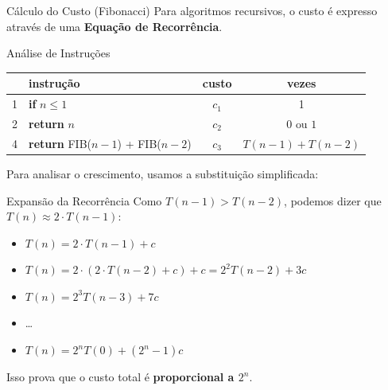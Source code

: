 \documentclass[9pt]{beamer}
\begin{document}
\begin{frame}{Cálculo do Custo (Fibonacci)}
    Para algoritmos recursivos, o custo é expresso através de uma \textbf{Equação de Recorrência}.
    \vspace{0.2cm}
    \begin{block}{Análise de Instruções}
        \centering
        \small
        \begin{tabular}{clcc}
            \hline
            & \textbf{instrução} & \textbf{custo} & \textbf{vezes} \\
            \hline
            1 & \textbf{if} $n \leq 1$ & $c_1$ & 1 \\
            2 & \quad \textbf{return} $n$ & $c_2$ & $0 \text{ ou } 1$ \\
            4 & \quad \textbf{return} FIB($n-1$) + FIB($n-2$) & $c_3$ & $T(n-1) + T(n-2)$ \\
            \hline
        \end{tabular}
    \end{block}
    \vspace{0.1cm}
    Para analisar o crescimento, usamos a substituição simplificada:
    \begin{block}{Expansão da Recorrência}
        \small
        Como $T(n-1) > T(n-2)$, podemos dizer que $T(n) \approx 2 \cdot T(n-1)$:
        \begin{itemize}
            \item $T(n) = 2 \cdot T(n-1) + c$
            \item $T(n) = 2 \cdot (2 \cdot T(n-2) + c) + c = 2^2 T(n-2) + 3c$
            \item $T(n) = 2^3 T(n-3) + 7c$
            \item \dots
            \item $T(n) = 2^n T(0) + (2^n - 1)c$
        \end{itemize}
    \end{block}
    \vspace{0.1cm}
    Isso prova que o custo total é \textbf{proporcional a $2^n$}.
\end{frame}
\end{document}
